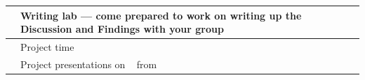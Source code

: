 \begin{table}[ht!]
\begin{center}
\begin{tabular}{c p{4in}}
	\midrule[0.01em]
	\wkFourteenMo & \begin{minipage}{4in}
	Writing lab --- come prepared to work on writing up the {\bf Discussion and Findings} with your group
	\end{minipage} \\
	\midrule[0.01em]
	\wkFifteenMo & \begin{minipage}{4in}
	Project time
	\end{minipage} \\
	\midrule[0.01em]
	\finalsWeekMo & \begin{minipage}{4in}
	Project presentations on \finalsDay~ from \finalsTime
	\end{minipage} \\
	\midrule[0.01em]
\end{tabular}
\end{center}
\end{table}
